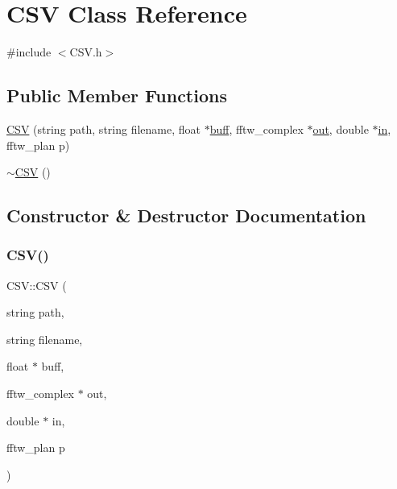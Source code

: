 \hypertarget{class_c_s_v}{}\section{C\+SV Class Reference}
\label{class_c_s_v}


{\ttfamily \#include $<$C\+S\+V.\+h$>$}

\subsection*{Public Member Functions}
\begin{DoxyCompactItemize}
\item 
\hyperlink{class_c_s_v_a7ba492a7aea573fdce5280c1b1f76d62}{C\+SV} (string path, string filename, float $\ast$\hyperlink{_get_mic_8cpp_aa621af3ba2234c04a5f309a94576b011}{buff}, fftw\+\_\+complex $\ast$\hyperlink{_get_mic_8cpp_a0ff8e98f72df2389143723d3b8e88ce2}{out}, double $\ast$\hyperlink{_get_mic_8cpp_a5e0f598fffa03bb7026d3a2a168810db}{in}, fftw\+\_\+plan p)
\item 
\hyperlink{class_c_s_v_ae1b0cfd98d62cf81004462320848c665}{$\sim$\+C\+SV} ()
\end{DoxyCompactItemize}


\subsection{Constructor \& Destructor Documentation}
\mbox{\label{class_c_s_v_a7ba492a7aea573fdce5280c1b1f76d62}} 
\subsubsection{\texorpdfstring{C\+S\+V()}{CSV()}}
{\footnotesize\ttfamily C\+S\+V\+::\+C\+SV (\begin{DoxyParamCaption}\item[{string}]{path,  }\item[{string}]{filename,  }\item[{float $\ast$}]{buff,  }\item[{fftw\+\_\+complex $\ast$}]{out,  }\item[{double $\ast$}]{in,  }\item[{fftw\+\_\+plan}]{p }\end{DoxyParamCaption})}

\mbox{\label{class_c_s_v_ae1b0cfd98d62cf81004462320848c665}} 
